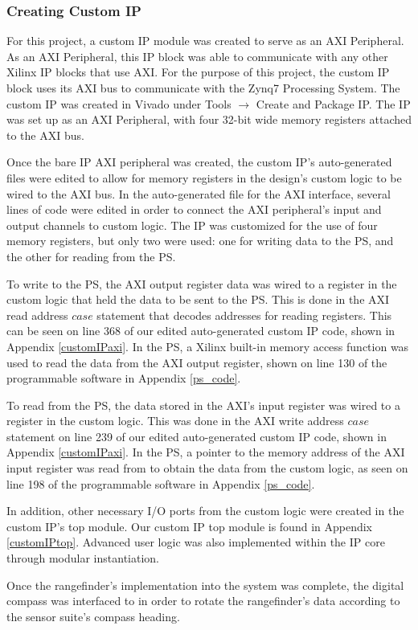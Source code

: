 \subsubsection{Creating Custom IP} \label{sssec:creatingCustomIP}
For this project, a custom IP module was created to serve as an AXI Peripheral. As an AXI Peripheral, this IP block was able to communicate with any other Xilinx IP blocks that use AXI. For the purpose of this project, the custom IP block uses its AXI bus to communicate with the Zynq7 Processing System. The custom IP was created in Vivado under Tools $\rightarrow$ Create and Package IP. The IP was set up as an AXI Peripheral, with four 32-bit wide memory registers attached to the AXI bus.
\par
Once the bare IP AXI peripheral was created, the custom IP's auto-generated files were edited to allow for memory registers in the design's custom logic to be wired to the AXI bus. In the auto-generated file for the AXI interface, several lines of code were edited in order to connect the AXI peripheral's input and output channels to custom logic. The IP was customized for the use of four memory registers, but only two were used: one for writing data to the PS, and the other for reading from the PS. 
\par
To write to the PS, the AXI output register data was wired to a register in the custom logic that held the data to be sent to the PS. This is done in the AXI read address $case$ statement that decodes addresses for reading registers. This can be seen on line 368 of our edited auto-generated custom IP code, shown in Appendix \ref{customIPaxi}. In the PS, a Xilinx built-in memory access function was used to read the data from the AXI output register, shown on line 130 of the programmable software in Appendix \ref{ps_code}.
\par
To read from the PS, the data stored in the AXI's input register was wired to a register in the custom logic. This was done in the AXI write address $case$ statement on line 239 of our edited auto-generated custom IP code, shown in Appendix \ref{customIPaxi}. In the PS, a pointer to the memory address of the AXI input register was read from to obtain the data from the custom logic, as seen on line 198 of the programmable software in Appendix \ref{ps_code}.
\par
In addition, other necessary I/O ports from the custom logic were created in the custom IP's top module. Our custom IP top module is found in Appendix \ref{customIPtop}. Advanced user logic was also implemented within the IP core through modular instantiation.
\par
Once the rangefinder's implementation into the system was complete, the digital compass was interfaced to in order to rotate the rangefinder's data according to the sensor suite's compass heading.
